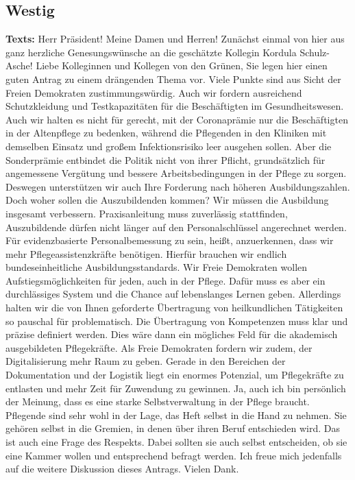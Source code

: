 \documentclass{article}
\begin{document}
\subsection{Westig}
\noindent\textbf{Texts:} Herr Präsident! Meine Damen und Herren! Zunächst einmal von hier aus ganz herzliche Genesungswünsche an die geschätzte Kollegin Kordula Schulz-Asche!  Liebe Kolleginnen und Kollegen von den Grünen, Sie legen hier einen guten Antrag zu einem drängenden Thema vor. Viele Punkte sind aus Sicht der Freien Demokraten zustimmungswürdig. Auch wir fordern ausreichend Schutzkleidung und Testkapazitäten für die Beschäftigten im Gesundheitswesen. Auch wir halten es nicht für gerecht, mit der Coronaprämie nur die Beschäftigten in der Altenpflege zu bedenken, während die Pflegenden in den Kliniken mit demselben Einsatz und großem Infektionsrisiko leer ausgehen sollen. Aber die Sonderprämie entbindet die Politik nicht von ihrer Pflicht, grundsätzlich für angemessene Vergütung und bessere Arbeitsbedingungen in der Pflege zu sorgen.  Deswegen unterstützen wir auch Ihre Forderung nach höheren Ausbildungszahlen. Doch woher sollen die Auszubildenden kommen? Wir müssen die Ausbildung insgesamt verbessern. Praxisanleitung muss zuverlässig stattfinden, Auszubildende dürfen nicht länger auf den Personalschlüssel angerechnet werden. Für evidenzbasierte Personalbemessung zu sein, heißt, anzuerkennen, dass wir mehr Pflegeassistenzkräfte benötigen. Hierfür brauchen wir endlich bundeseinheitliche Ausbildungsstandards.  Wir Freie Demokraten wollen Aufstiegsmöglichkeiten für jeden, auch in der Pflege. Dafür muss es aber ein durchlässiges System und die Chance auf lebenslanges Lernen geben. Allerdings halten wir die von Ihnen geforderte Übertragung von heilkundlichen Tätigkeiten so pauschal für problematisch. Die Übertragung von Kompetenzen muss klar und präzise definiert werden. Dies wäre dann ein mögliches Feld für die akademisch ausgebildeten Pflegekräfte. Als Freie Demokraten fordern wir zudem, der Digitalisierung mehr Raum zu geben. Gerade in den Bereichen der Dokumentation und der Logistik liegt ein enormes Potenzial, um Pflegekräfte zu entlasten und mehr Zeit für Zuwendung zu gewinnen.  Ja, auch ich bin persönlich der Meinung, dass es eine starke Selbstverwaltung in der Pflege braucht. Pflegende sind sehr wohl in der Lage, das Heft selbst in die Hand zu nehmen. Sie gehören selbst in die Gremien, in denen über ihren Beruf entschieden wird. Das ist auch eine Frage des Respekts. Dabei sollten sie auch selbst entscheiden, ob sie eine Kammer wollen und entsprechend befragt werden. Ich freue mich jedenfalls auf die weitere Diskussion dieses Antrags. Vielen Dank.  
\end{document}
